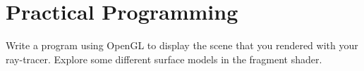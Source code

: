 \documentclass{supervision}
\begin{document}
\section*{Practical Programming}
\begin{questions}
    \question
    Write a program using OpenGL to display the scene that you rendered with your ray-tracer. Explore some different surface models in the fragment shader.
\end{questions}
\end{document}
